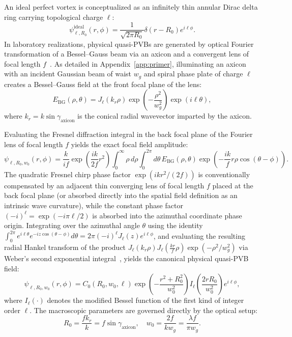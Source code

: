 \documentclass[11pt,a4paper]{article}
\begin{document}
An ideal perfect vortex is conceptualized as an infinitely thin annular Dirac delta ring carrying topological charge $\ell$:
\begin{equation}
\psi_{\ell, R_0}^{\text{ideal}}(r, \phi) = \frac{1}{\sqrt{2\pi R_0}} \delta(r - R_0) e^{i \ell \phi}.
\label{eq:ideal_pvb}
\end{equation}
In laboratory realizations, physical quasi-PVBs are generated by optical Fourier transformation of a Bessel--Gauss beam via an axicon and a convergent lens of focal length $f$~\cite{Vaity2015}. As detailed in Appendix~\ref{app:primer}, illuminating an axicon with an incident Gaussian beam of waist $w_g$ and spiral phase plate of charge $\ell$ creates a Bessel--Gauss field at the front focal plane of the lens:
\begin{equation}
E_{\text{BG}}(\rho, \theta) = J_\ell(k_r \rho) \exp\left( -\frac{\rho^2}{w_g^2} \right) \exp(i \ell \theta),
\label{eq:bg_field}
\end{equation}
where $k_r = k \sin \gamma_{\text{axicon}}$ is the conical radial wavevector imparted by the axicon.

Evaluating the Fresnel diffraction integral in the back focal plane of the Fourier lens of focal length $f$ yields the exact focal field amplitude:
\begin{equation}
\psi_{\ell, R_0, w_0}(r, \phi) = \frac{k}{i f} \exp\left( \frac{i k}{2f} r^2 \right) \int_0^\infty \rho \, d\rho \int_0^{2\pi} d\theta \, E_{\text{BG}}(\rho, \theta) \exp\left( - \frac{i k}{f} r \rho \cos(\theta - \phi) \right).
\label{eq:fresnel_integral_focal}
\end{equation}
The quadratic Fresnel chirp phase factor $\exp(i k r^2 / (2f))$ is conventionally compensated by an adjacent thin converging lens of focal length $f$ placed at the back focal plane (or absorbed directly into the spatial field definition as an intrinsic wave curvature), while the constant phase factor $(-i)^\ell = \exp(-i \pi \ell / 2)$ is absorbed into the azimuthal coordinate phase origin. Integrating over the azimuthal angle $\theta$ using the identity $\int_0^{2\pi} e^{i \ell \theta} e^{-i z \cos(\theta - \phi)} d\theta = 2\pi (-i)^\ell J_\ell(z) e^{i \ell \phi}$, and evaluating the resulting radial Hankel transform of the product $J_\ell(k_r \rho) J_\ell(\frac{k r}{f} \rho) \exp(-\rho^2 / w_g^2)$ via Weber's second exponential integral~\cite{Gradshteyn2014}, yields the canonical physical quasi-PVB field:
\begin{equation}
\psi_{\ell, R_0, w_0}(r, \phi) = C_0(R_0, w_0, \ell) \exp\left( - \frac{r^2 + R_0^2}{w_0^2} \right) I_\ell\left( \frac{2 r R_0}{w_0^2} \right) e^{i \ell \phi},
\label{eq:pvb_field}
\end{equation}
where $I_\ell(\cdot)$ denotes the modified Bessel function of the first kind of integer order $\ell$. The macroscopic parameters are governed directly by the optical setup:
\begin{equation}
R_0 = \frac{f k_r}{k} = f \sin \gamma_{\text{axicon}}, \quad w_0 = \frac{2 f}{k w_g} = \frac{\lambda f}{\pi w_g}.
\label{eq:r0_w0_parameters}
\end{equation}
\end{document}
